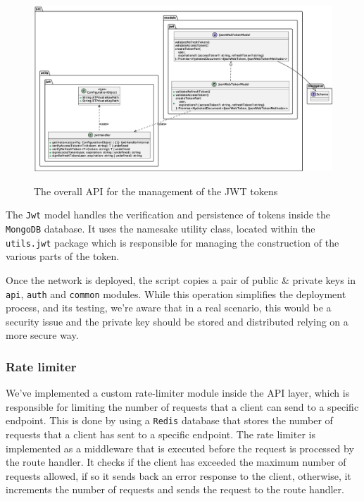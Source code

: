 \documentclass{scrartcl}
\begin{document}

\begin{figure}
    \centering
    \includegraphics[width=\linewidth]{figures/jwt-api.eps}
    \label{fig:jwt-packages-api} 
    \caption{The overall API for the management of the JWT tokens}
\end{figure}

The \texttt{Jwt} model handles the verification and persistence of tokens inside the \texttt{MongoDB} database. It uses the namesake utility class, located within the \texttt{utils.jwt} package which is responsible for managing the construction of the various parts of the token.

\begin{warn}
    Once the network is deployed, the script copies a pair of public \& private keys in \texttt{api}, \texttt{auth} and \texttt{common} modules. While this operation simplifies the deployment process, and its testing, we're aware that in a real scenario, this would be a security issue and the private key should be stored and distributed relying on a more secure way.
\end{warn}

\subsubsection{Rate limiter}
We've implemented a custom rate-limiter module inside the API layer, which is responsible for limiting the number of requests that a client can send to a specific endpoint. This is done by using a \texttt{Redis} database that stores the number of requests that a client has sent to a specific endpoint. The rate limiter is implemented as a middleware that is executed before the request is processed by the route handler. It checks if the client has exceeded the maximum number of requests allowed, if so it sends back an error response to the client, otherwise, it increments the number of requests and sends the request to the route handler.
\end{document}
